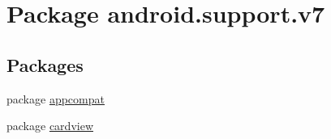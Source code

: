 \hypertarget{namespaceandroid_1_1support_1_1v7}{}\section{Package android.\+support.\+v7}
\label{namespaceandroid_1_1support_1_1v7}
\subsection*{Packages}
\begin{DoxyCompactItemize}
\item 
package \hyperlink{namespaceandroid_1_1support_1_1v7_1_1appcompat}{appcompat}
\item 
package \hyperlink{namespaceandroid_1_1support_1_1v7_1_1cardview}{cardview}
\end{DoxyCompactItemize}
